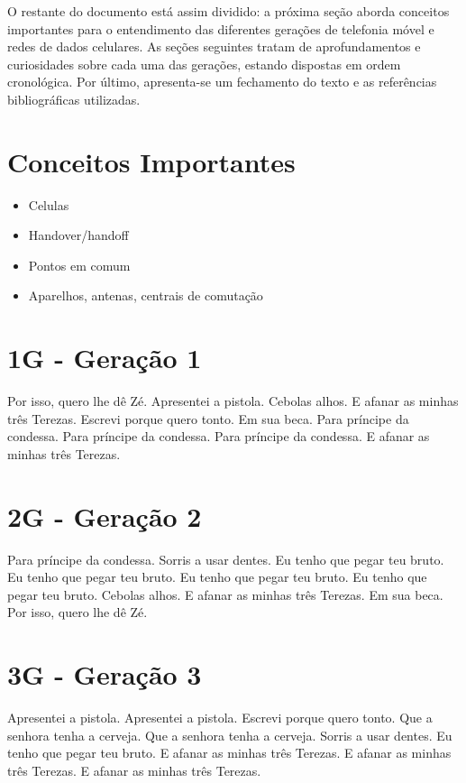 \documentclass[11pt,oneside,a4paper]{abntex2}
\begin{document}
O restante do documento está assim dividido: a próxima seção aborda conceitos importantes para o entendimento das diferentes gerações de telefonia móvel e redes de dados celulares. As seções seguintes tratam de aprofundamentos e curiosidades sobre cada uma das gerações, estando dispostas em ordem cronológica. Por último, apresenta-se um fechamento do texto e as referências bibliográficas utilizadas.

\section*{Conceitos Importantes}
\label{conceitos}

\begin{itemize}
	\item Celulas
	\item Handover/handoff
	\item Pontos em comum
	\item Aparelhos, antenas, centrais de comutação
\end{itemize}

\section*{1G - Geração 1}
\label{1g}

Por isso, quero lhe dê Zé. Apresentei a pistola. Cebolas alhos. E afanar as minhas três Terezas. Escrevi porque quero tonto. Em sua beca. Para príncipe da condessa. Para príncipe da condessa. Para príncipe da condessa. E afanar as minhas três Terezas.

\section*{2G - Geração 2}
\label{2g}

Para príncipe da condessa. Sorris a usar dentes. Eu tenho que pegar teu bruto. Eu tenho que pegar teu bruto. Eu tenho que pegar teu bruto. Eu tenho que pegar teu bruto. Cebolas alhos. E afanar as minhas três Terezas. Em sua beca. Por isso, quero lhe dê Zé.

\section*{3G - Geração 3}
\label{3g}

Apresentei a pistola. Apresentei a pistola. Escrevi porque quero tonto. Que a senhora tenha a cerveja. Que a senhora tenha a cerveja. Sorris a usar dentes. Eu tenho que pegar teu bruto. E afanar as minhas três Terezas. E afanar as minhas três Terezas. E afanar as minhas três Terezas.
\end{document}
